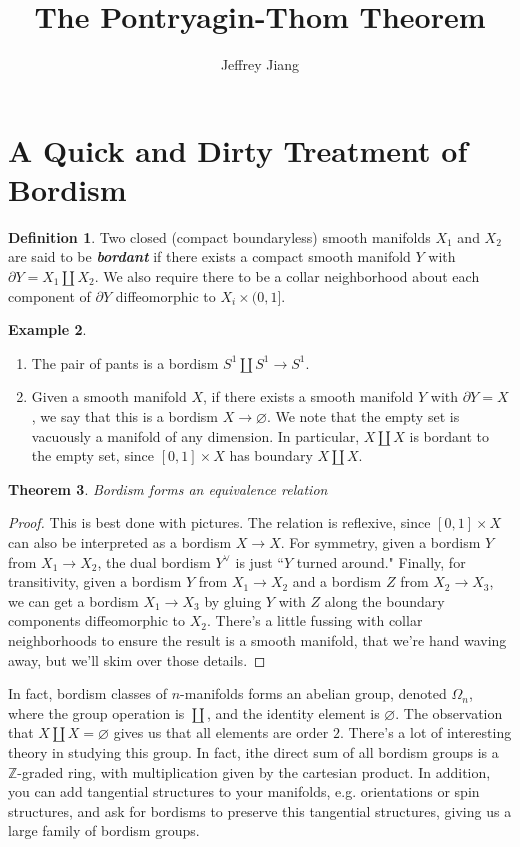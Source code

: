 \documentclass[psamsfonts]{amsart}
\newtheorem{thm}{Theorem}[section]
\theoremstyle{definition}
\newtheorem{defn}[thm]{Definition}
\newtheorem{exmp}[thm]{Example}
\theoremstyle{remark}
\renewcommand{\emptyset}{\varnothing}
\newcommand{\ib}[1]{\textbf{\textit{#1}}}
\newcommand{\Z}{\mathbb{Z}}
\newcommand{\enumbreak}{\ \\ \vspace{-\baselineskip}}
\newcommand{\bd}{\partial}
\begin{document}
\author{Jeffrey Jiang}
\title{The Pontryagin-Thom Theorem}
\maketitle
\setcounter{section}{1}
\section*{A Quick and Dirty Treatment of Bordism}
%
\begin{defn}
Two closed (compact boundaryless) smooth manifolds $X_1$ and $X_2$ are said to be \ib{bordant} if there exists a compact smooth manifold  $Y$ with $\bd Y = X_1 \coprod X_2$. We also require there to be a collar neighborhood about each component of $\bd Y$ diffeomorphic to $X_i \times (0,1]$.
\end{defn}
%
\begin{exmp}\enumbreak
\begin{enumerate}
\item The pair of pants is a bordism $S^1 \coprod S^1 \to S^1$.
\item Given a smooth manifold $X$, if there exists a smooth manifold $Y$ with $\bd Y = X$, we say that this is a bordism $X \to \emptyset$. We note that the empty set is vacuously a manifold of any dimension. In particular, $X \coprod X$ is bordant to the empty set, since $[0,1] \times X$ has boundary $X \coprod X$.
\end{enumerate}
\end{exmp}
%
\begin{thm}
Bordism forms an equivalence relation
\end{thm}
%
\begin{proof}
This is best done with pictures. The relation is reflexive, since $[0,1] \times X$ can also be interpreted as a bordism $X \to X$. For symmetry, given a bordism $Y$ from $X_1 \to X_2$, the dual bordism $Y^\vee$ is just ``$Y$ turned around." Finally, for transitivity, given a bordism $Y$ from $X_1 \to X_2$ and a bordism $Z$ from $X_2 \to X_3$, we can get a bordism $X_1 \to X_3$ by gluing $Y$ with $Z$ along the boundary components diffeomorphic to $X_2$. There's a little fussing with collar neighborhoods to ensure the result is a smooth manifold, that we're hand waving away, but we'll skim over those details.
\end{proof}
In fact, bordism classes of $n$-manifolds forms an abelian group, denoted $\Omega_n$, where the group operation is $\coprod$, and the identity element is $\emptyset$. The observation that $X \coprod X = \emptyset$ gives us that all elements are order $2$. There's a lot of interesting theory in studying this group. In fact, ithe direct sum of all bordism groups is a $\Z$-graded ring, with multiplication given by the cartesian product. In addition, you can add tangential structures to your manifolds, e.g. orientations or spin structures, and ask for bordisms to preserve this tangential structures, giving us a large family of bordism groups. 
%
\setcounter{section}{2}
%
\setcounter{thm}{0}
%
\end{document}
